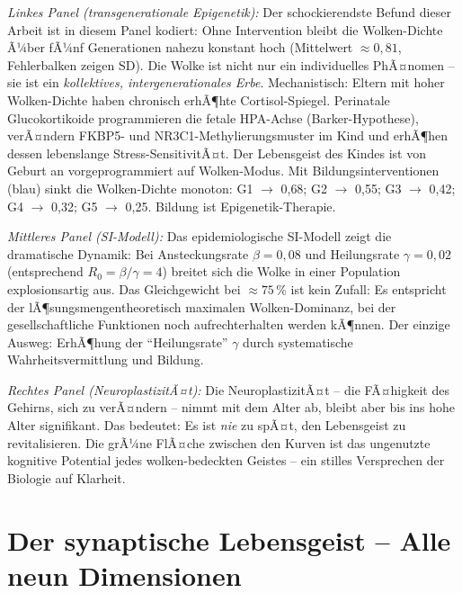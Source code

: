 ﻿\documentclass[12pt,a4paper]{report}
\theoremstyle{plain}
\theoremstyle{definition}
\theoremstyle{remark}
\begin{document}
	\textit{Linkes Panel (transgenerationale Epigenetik):}
	Der schockierendste Befund dieser Arbeit ist in diesem Panel kodiert:
	Ohne Intervention bleibt die Wolken-Dichte Ã¼ber fÃ¼nf Generationen nahezu
	konstant hoch (Mittelwert $\approx 0{,}81$, Fehlerbalken zeigen SD).
	Die Wolke ist nicht nur ein individuelles PhÃ¤nomen -- sie ist ein
	\emph{kollektives, intergenerationales Erbe}.
	Mechanistisch: Eltern mit hoher Wolken-Dichte haben chronisch erhÃ¶hte
	Cortisol-Spiegel. Perinatale Glucokortikoide programmieren die fetale
	HPA-Achse (Barker-Hypothese), verÃ¤ndern FKBP5- und NR3C1-Methylierungsmuster
	im Kind und erhÃ¶hen dessen lebenslange Stress-SensitivitÃ¤t.
	Der Lebensgeist des Kindes ist von Geburt an vorgeprogrammiert auf
	Wolken-Modus.
	Mit Bildungsinterventionen (blau) sinkt die Wolken-Dichte monoton:
	G1 $\to$ 0{,}68; G2 $\to$ 0{,}55; G3 $\to$ 0{,}42; G4 $\to$ 0{,}32; G5 $\to$ 0{,}25.
	Bildung ist Epigenetik-Therapie.

	\textit{Mittleres Panel (SI-Modell):}
	Das epidemiologische SI-Modell zeigt die dramatische Dynamik:
	Bei Ansteckungsrate $\beta = 0{,}08$ und Heilungsrate $\gamma = 0{,}02$
	(entsprechend $R_0 = \beta/\gamma = 4$) breitet sich die Wolke in einer
	Population explosionsartig aus. Das Gleichgewicht bei $\approx 75\,\%$
	ist kein Zufall: Es entspricht der lÃ¶sungsmengentheoretisch maximalen
	Wolken-Dominanz, bei der gesellschaftliche Funktionen noch aufrechterhalten
	werden kÃ¶nnen.
	Der einzige Ausweg: ErhÃ¶hung der ``Heilungsrate'' $\gamma$ durch
	systematische Wahrheitsvermittlung und Bildung.

	\textit{Rechtes Panel (NeuroplastizitÃ¤t):}
	Die NeuroplastizitÃ¤t -- die FÃ¤higkeit des Gehirns, sich zu verÃ¤ndern
	-- nimmt mit dem Alter ab, bleibt aber bis ins hohe Alter signifikant.
	Das bedeutet: Es ist \emph{nie} zu spÃ¤t, den Lebensgeist zu revitalisieren.
	Die grÃ¼ne FlÃ¤che zwischen den Kurven ist das ungenutzte kognitive
	Potential jedes wolken-bedeckten Geistes -- ein stilles Versprechen
	der Biologie auf Klarheit.
	
	\section{Der synaptische Lebensgeist -- Alle neun Dimensionen}
	
\end{document}
